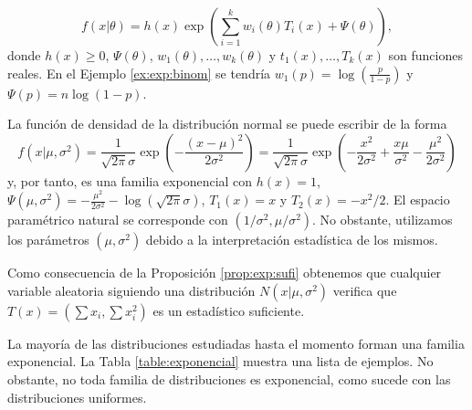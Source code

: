 \documentclass{article}
\begin{document}
    \begin{equation} \label{eq:exponencial:2}
        f(x | \theta) = h(x) \exp\left(\sum^k_{i=1} w_i(\theta) T_i(x)  + \Psi(\theta)\right),
    \end{equation}
    donde  $h(x) \ge 0$, $\Psi(\theta)$, $w_1(\theta), \ldots, w_k(\theta)$ y $t_1(x), \ldots, T_k(x)$ son funciones reales. En el Ejemplo \ref{ex:exp:binom} se tendría $w_1(p) = \log(\frac{p}{1-p})$ y $\Psi(p) = n \log(1-p)$.

    \begin{ex} \label{ex:exp:normal}
        La función de densidad de la distribución normal se puede escribir de la forma
        \[f(x|\mu,\sigma^2) = \frac{1}{\sqrt{2 \pi} \sigma} \exp\left(- \frac{(x-\mu)^2}{2\sigma^2}\right) = \frac{1}{\sqrt{2 \pi} \sigma} \exp\left(- \frac{x^2}{2\sigma^2} + \frac{x\mu}{\sigma^2} - \frac{\mu^2}{2\sigma^2}\right)\]
        y, por tanto, es una familia exponencial con $h(x) = 1$, $\Psi(\mu, \sigma^2) = -\frac{\mu^2}{2\sigma^2} - \log(\sqrt{2\pi} \sigma)$, $T_1(x) = x$ y $T_2(x) = - x^2 / 2$.
        El espacio paramétrico natural se corresponde con $(1/\sigma^2, \mu/\sigma^2)$. No obstante, utilizamos los parámetros $(\mu, \sigma^2)$ debido a la interpretación estadística de los mismos.

        Como consecuencia de la Proposición \ref{prop:exp:sufi} obtenemos que cualquier variable aleatoria siguiendo una distribución $N(x|\mu, \sigma^2)$ verifica que $T(x) = (\sum x_i, \sum x_i^2)$ es un estadístico suficiente.
    \end{ex}

    La mayoría de las distribuciones estudiadas hasta el momento forman una familia exponencial. La Tabla \ref{table:exponencial} muestra una lista de ejemplos. No obstante, no toda familia de distribuciones es exponencial, como sucede con las distribuciones uniformes.
\end{document}
